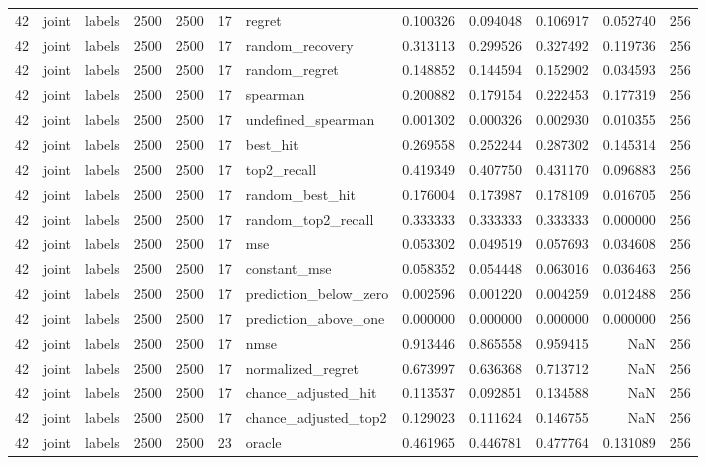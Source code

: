 \begin{tabular}{rllrrrlrrrrr}
42 & joint & labels & 2500 & 2500 & 17 & regret & 0.100326 & 0.094048 & 0.106917 & 0.052740 & 256 \\
42 & joint & labels & 2500 & 2500 & 17 & random_recovery & 0.313113 & 0.299526 & 0.327492 & 0.119736 & 256 \\
42 & joint & labels & 2500 & 2500 & 17 & random_regret & 0.148852 & 0.144594 & 0.152902 & 0.034593 & 256 \\
42 & joint & labels & 2500 & 2500 & 17 & spearman & 0.200882 & 0.179154 & 0.222453 & 0.177319 & 256 \\
42 & joint & labels & 2500 & 2500 & 17 & undefined_spearman & 0.001302 & 0.000326 & 0.002930 & 0.010355 & 256 \\
42 & joint & labels & 2500 & 2500 & 17 & best_hit & 0.269558 & 0.252244 & 0.287302 & 0.145314 & 256 \\
42 & joint & labels & 2500 & 2500 & 17 & top2_recall & 0.419349 & 0.407750 & 0.431170 & 0.096883 & 256 \\
42 & joint & labels & 2500 & 2500 & 17 & random_best_hit & 0.176004 & 0.173987 & 0.178109 & 0.016705 & 256 \\
42 & joint & labels & 2500 & 2500 & 17 & random_top2_recall & 0.333333 & 0.333333 & 0.333333 & 0.000000 & 256 \\
42 & joint & labels & 2500 & 2500 & 17 & mse & 0.053302 & 0.049519 & 0.057693 & 0.034608 & 256 \\
42 & joint & labels & 2500 & 2500 & 17 & constant_mse & 0.058352 & 0.054448 & 0.063016 & 0.036463 & 256 \\
42 & joint & labels & 2500 & 2500 & 17 & prediction_below_zero & 0.002596 & 0.001220 & 0.004259 & 0.012488 & 256 \\
42 & joint & labels & 2500 & 2500 & 17 & prediction_above_one & 0.000000 & 0.000000 & 0.000000 & 0.000000 & 256 \\
42 & joint & labels & 2500 & 2500 & 17 & nmse & 0.913446 & 0.865558 & 0.959415 & NaN & 256 \\
42 & joint & labels & 2500 & 2500 & 17 & normalized_regret & 0.673997 & 0.636368 & 0.713712 & NaN & 256 \\
42 & joint & labels & 2500 & 2500 & 17 & chance_adjusted_hit & 0.113537 & 0.092851 & 0.134588 & NaN & 256 \\
42 & joint & labels & 2500 & 2500 & 17 & chance_adjusted_top2 & 0.129023 & 0.111624 & 0.146755 & NaN & 256 \\
42 & joint & labels & 2500 & 2500 & 23 & oracle & 0.461965 & 0.446781 & 0.477764 & 0.131089 & 256 \\

\end{tabular}

